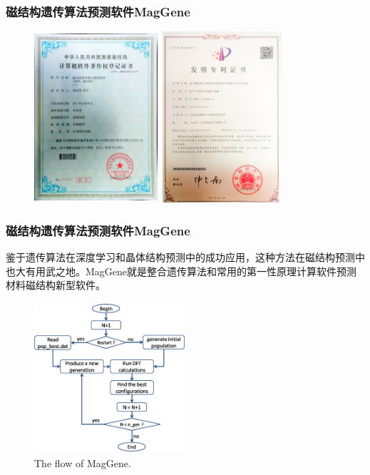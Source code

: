 \documentclass[cjk,slidestop,compress,mathserif,blue]{beamer}
\begin{document}
\frame
{
	\frametitle{磁结构遗传算法预测软件\textrm{MagGene}}
\begin{figure}[h!]
\centering
\includegraphics[height=2.5in,width=1.8in]{Figures/MagGene-copyright.png}
\hspace*{0.1in}
\includegraphics[height=2.5in,width=1.8in]{Figures/MagGene-Patent-inv.png}
\label{Fig:MagGenea-Patent}
\end{figure}
}

\frame
{
	\frametitle{磁结构遗传算法预测软件\textrm{MagGene}}
鉴于遗传算法在深度学习和晶体结构预测中的成功应用，这种方法在磁结构预测中也大有用武之地。\textrm{MagGene}就是整合遗传算法和常用的第一性原理计算软件预测材料磁结构新型软件。
\begin{figure}[h!]
\centering
\includegraphics[height=2.2in,width=2.2in]{Figures/MagGene-Flow.png}
\caption{\tiny \textrm{The flow of MagGene.}}%
\label{Fig:MagGene-Flow}
\end{figure}
}
\end{document}
